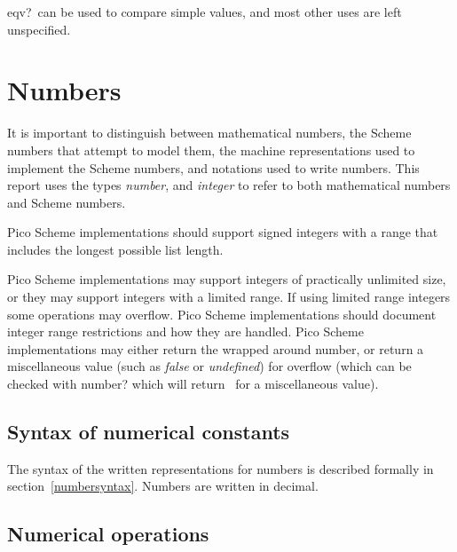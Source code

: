 \begin{entry}{%
}
\begin{rationale} {\cf eqv?}\ can be used to compare simple values, and
most other uses are left unspecified.
\end{rationale}

\end{entry}

\section{Numbers}
\label{numbersection}

\newcommand{\type}[1]{{\it#1}}
\newcommand{\tupe}[1]{{#1}}

It is important to distinguish between mathematical numbers, the
Scheme numbers that attempt to model them, the machine representations
used to implement the Scheme numbers, and notations used to write
numbers.  This report uses the types \type{number}, and \type{integer}
to refer to both mathematical numbers and Scheme numbers.

Pico Scheme implementations should support signed integers with a
range that includes the longest possible list length.

\begin{note}
Pico Scheme implementations may support integers of practically
unlimited size, or they may support integers with a limited range.  If
using limited range integers some operations may overflow. Pico Scheme
implementations should document integer range restrictions and how
they are handled. Pico Scheme implementations may either return the
wrapped around number, or return a miscellaneous value (such as {\it
  false} or {\it undefined}) for overflow (which can be checked with
{\cf number?} which will return \schfalse\ for a miscellaneous value).
\end{note}

\subsection{Syntax of numerical constants}
\label{numbernotations}

The syntax of the written representations for numbers is described formally in
section~\ref{numbersyntax}. Numbers are written in decimal.

\subsection{Numerical operations}

